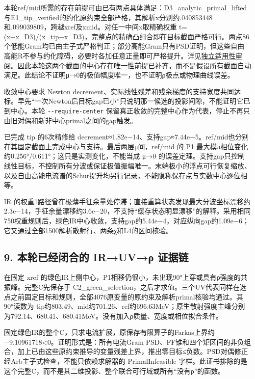 \documentclass[
  10pt,
  a4paper,
]{article}
\begin{document}
本轮ref/mid所需的存在前提可由已有两点具体满足：D3\_analytic\_primal\_lifted与E1\_tip\_verified的约化原约束全部严格，其解析x分别约.040853448和.099039809，跨越xref及xmid。对任一中间x取精确权重
t=(x−x\_D3)/(x\_tip−x\_D3)，完整点的精确凸组合即在目标截面严格可行。两点86个低能Gram均已由主子式严格判正；部分高能Gram只有PSD证明，但这些自由高能R不参与约化障碍，必要时各加任意正量即可严格提升。详见\href{../../../../sequential_reproduction_20260910/PROOF_SCOPE_REVIEW_ZH.md}{独立适用性审阅}。因此本轮这两个截面的中心存在唯一性前提已补齐，而不是假设所有截面自动满足。此结论不证明μ→0的极值幅度唯一，也不证明ρ极点或物理曲线误差。

收敛中心要求 Newton
decrement、实际线性残差和残余梯度的支持宽度共同达标。早先``一次Newton后目标gap已小''只说明那一候选的投影间隙，不能证明它已到中心。本轮
\texttt{-\/-require-center}
保留真正收敛的完整中心作为代表，停止不再只由旧对偶和新非中心primal之间的gap触发。

已完成 tip 的6次精修给
decrement≈1.82e−14、支持gap≈7.44e−5。ref/mid也分别在其固定截面上完成中心与支持。最后两层μ间，ref/mid
的 P1 最大模π相位变化约0.256°/0.611°；这只是实测变化，不能当成 μ→0
的误差定理。支持gap只控制线性目标，不控制所有分波或保证极值振幅唯一。末端极小的浮点可行恢复缩放、以及自由高能电流谱的Schur提升均另行记录，不能隐称保存点与实数中心逐位相等。

IR
的权重1路径曾在极薄手征余量处停滞；直接重算状态发现最大分波坐标漂移约2.3e−14，手征余量漂移约3.6e−20，不支持``缓存状态明显漂移''的解释。采用相同750权重规则后，绿色IR中心收敛，支持gap约5.44e−4，对应纵向gap约1.09e−6；它又通过全部1500解析散射行、两条χ和L4的区间核验。

\subsection{9. 本轮已经闭合的 IR→UV→ρ
证据链}\label{ux672cux8f6eux5df2ux7ecfux95edux5408ux7684-iruvux3c1-ux8bc1ux636eux94fe}

在固定 xref
的绿色IR上侧中心，P1相移仍很小，未出现90°上穿或具有ρ强度的共振峰。完整C先保存于
C2\_green\_selection，之后才求值。三个UV代表同样在选点之前固定目标和规则，全部4076原变量的原约束及解析primal核验均通过。其90°读数为
tip约803.49、mid约701.26、ref约696.63MeV；原生散射强度主峰分别为792.14、680.41、680.41MeV。没有加入ρ质量、宽度或相位拟合条件。

固定绿色IR的整个C，只求电流扩展，原保存有限算子的Farkas上界约−9.10961718\textless0。证明形式是：所有电流Gram
PSD、FF锥和四个矩区间的非负组合，加上已由这些原约束推导的变量残差上界，推出零目标≤负数。PSD对偶修正经Arb主子式检查，不能只依赖求解器的
PrimalInfeasible
字样。此证书排除的是这个完整C，而不是其二维投影、整个联合可行域或所有``没有ρ''的函数。
\end{document}
